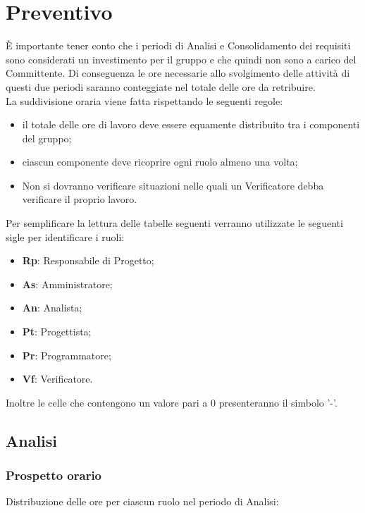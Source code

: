 \section{Preventivo}
È importante tener conto che i periodi di Analisi e Consolidamento dei requisiti sono considerati un investimento per il gruppo e che quindi non sono a carico del Committente.
Di conseguenza le ore necessarie allo svolgimento delle attività di questi due periodi saranno conteggiate nel totale delle ore da retribuire. \\

La suddivisione oraria viene fatta rispettando le seguenti regole:
\begin{itemize}
	\item il totale delle ore di lavoro deve essere equamente distribuito tra i componenti del gruppo;
	\item ciascun componente deve ricoprire ogni ruolo almeno una volta;
	\item Non si dovranno verificare situazioni nelle quali un Verificatore debba verificare il proprio lavoro.
\end{itemize}

Per semplificare la lettura delle tabelle seguenti verranno utilizzate le seguenti sigle per identificare i ruoli:
\begin{itemize}
	\item \textbf{Rp}: Responsabile di Progetto;
	\item \textbf{As}: Amministratore;
	\item \textbf{An}: Analista;
	\item \textbf{Pt}: Progettista;
	\item \textbf{Pr}: Programmatore;
	\item \textbf{Vf}: Verificatore.
\end{itemize}
Inoltre le celle che contengono un valore pari a 0 presenteranno il simbolo '-'.

\newpage

\subsection{Analisi}
	\subsubsection{Prospetto orario}
		Distribuzione delle ore per ciascun ruolo nel periodo di Analisi:

